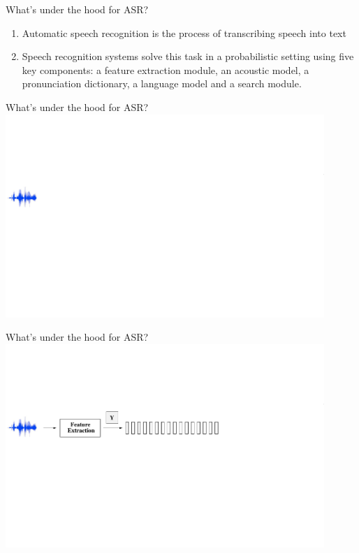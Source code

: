 \begin{frame}{What's under the hood for ASR?}
\begin{enumerate}
\item Automatic speech recognition is the process of \alert{transcribing speech into text}
\item Speech recognition systems solve this task in a probabilistic setting using five key
components: \alert{a feature extraction module, an acoustic model, a pronunciation dictionary, a language model
and a search module.}
\end{enumerate}
\end{frame}

\begin{frame}{What's under the hood for ASR?}
\includegraphics[height=77mm]{figures/ASR1}
\end{frame}

\begin{frame}{What's under the hood for ASR?}
\includegraphics[height=77mm]{figures/ASR2}
\end{frame}

